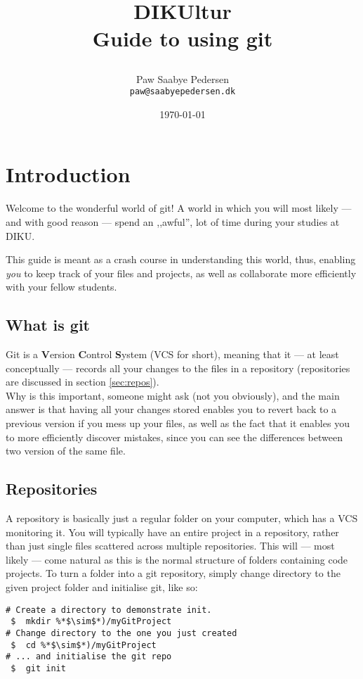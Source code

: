 \documentclass[11pt,a4paper,oneside,final,titlepage]{article}
\title{
    \LARGE{DIKUltur}\\
    \huge{Guide to using git}
    \author{
        Paw Saabye Pedersen\\
        \texttt{paw@saabyepedersen.dk}
    }
    \date{\today}
}
\begin{document}
\maketitle
\thispagestyle{empty}

\clearpage
\thispagestyle{empty}
\tableofcontents
\clearpage

\thispagestyle{fancyplain}
\setcounter{page}{1}

\section{Introduction}
Welcome to the wonderful world of git! A world in which you will most likely
--- and with good reason --- spend an ,,awful'', lot of time during your studies at
DIKU.

This guide is meant as a crash course in understanding this world, thus, enabling
\textit{you} to keep track of your files and projects, as well as collaborate
more efficiently with your fellow students.

\subsection{What is git}
Git is a \textbf{V}ersion \textbf{C}ontrol \textbf{S}ystem (VCS for short),
meaning that it --- at least conceptually --- records all your changes to the
files in a repository (repositories are discussed in section \ref{sec:repos}).\\
Why is this important, someone might ask (not you obviously), and the main
answer is that having all your changes stored enables you to revert back to a
previous version if you mess up your files, as well as the fact that it enables
you to more efficiently discover mistakes, since you can see the differences
between two version of the same file.

\subsection{Repositories}
A repository is basically just a regular folder on your computer, which has a
VCS monitoring it. You will typically have an entire project in a repository,
rather than just single files scattered across multiple repositories. This will
--- most likely --- come natural as this is the normal structure of folders
containing code projects.
To turn a folder into a git repository, simply change directory to the given
project folder and initialise git, like so:

\begin{lstlisting}[name=lst:initialiseRepo,caption=Start monitoring a folder,
                   label=lst:initialiseRepo,style=git]
# Create a directory to demonstrate init.
 $  mkdir %*$\sim$*)/myGitProject
# Change directory to the one you just created
 $  cd %*$\sim$*)/myGitProject
# ... and initialise the git repo
 $  git init
\end{lstlisting}
\end{document}
